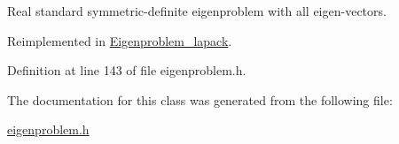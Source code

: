 Real standard symmetric-\/definite eigenproblem with all eigen-\/vectors. 



Reimplemented in \hyperlink{class_eigenproblem__lapack_a06c177a75b8195d1c7a03d56ee6d343e}{Eigenproblem\+\_\+lapack}.



Definition at line 143 of file eigenproblem.\+h.



The documentation for this class was generated from the following file\+:\begin{DoxyCompactItemize}
\item 
\hyperlink{eigenproblem_8h}{eigenproblem.\+h}\end{DoxyCompactItemize}
